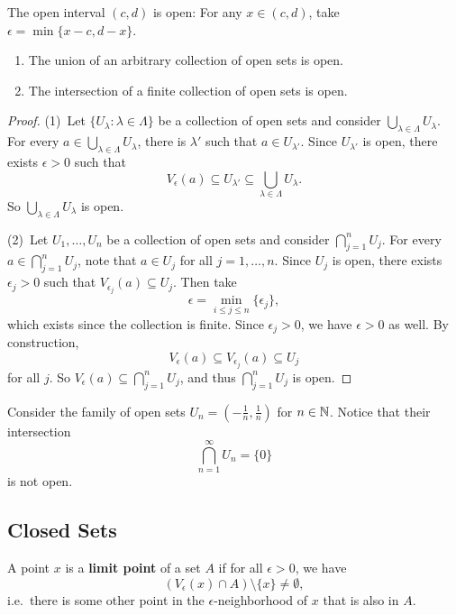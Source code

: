 \begin{example}
  The open interval $(c, d)$ is open: For any
  $x \in (c, d)$, take $\epsilon = \min\{x - c, d - x\}$.
\end{example}

\begin{theorem}\leavevmode
  \begin{enumerate}
    \item The union of an arbitrary collection of open sets
      is open.
    \item The intersection of a finite collection of
      open sets is open.
  \end{enumerate}
\end{theorem}

\begin{proof}
  (1)\, Let $\{U_\lambda : \lambda \in \Lambda\}$ be a
  collection of open sets and consider
  $\bigcup_{\lambda \in \Lambda} U_\lambda$. For
  every $a \in \bigcup_{\lambda \in \Lambda} U_\lambda$,
  there is $\lambda'$ such that $a \in U_{\lambda'}$.
  Since $U_{\lambda'}$ is open, there exists
  $\epsilon > 0$ such that
  \[V_\epsilon(a) \subseteq U_{\lambda'} \subseteq \bigcup_{\lambda \in \Lambda} U_\lambda.\]
  So $\bigcup_{\lambda \in \Lambda} U_\lambda$ is open.

  (2)\, Let $U_1, \ldots, U_n$ be a collection of
  open sets and consider $\bigcap_{j = 1}^n U_j$.
  For every $a \in \bigcap_{j = 1}^n U_j$, note that
  $a \in U_j$ for all $j = 1, \ldots, n$. Since
  $U_j$ is open, there exists $\epsilon_j > 0$ such that
  $V_{\epsilon_j}(a) \subseteq U_j$. Then take
  \[\epsilon = \min_{i \le j \le n}\{\epsilon_j\},\]
  which exists since the collection is finite.
  Since $\epsilon_j > 0$, we have $\epsilon > 0$ as well.
  By construction,
  \[V_\epsilon(a) \subseteq V_{\epsilon_j}(a) \subseteq U_j\]
  for all $j$. So
  $V_\epsilon(a) \subseteq \bigcap_{j = 1}^n U_j$, and
  thus $\bigcap_{j = 1}^n U_j$ is open.
\end{proof}

\begin{example}
  Consider the family of open sets
  $U_n = (-\frac{1}{n}, \frac{1}{n})$ for $n \in \mathbb{N}$. Notice
  that their intersection
  \[\bigcap_{n = 1}^\infty U_n = \{0\}\]
  is not open.
\end{example}

\subsection{Closed Sets}
\begin{definition}
  A point $x$ is a \textbf{limit point} of a set
  $A$ if for all $\epsilon > 0$, 
  we have
  \[(V_\epsilon(x) \cap A) \setminus \{x\} \ne \emptyset,\]
  i.e.~there is some other point in the
  $\epsilon$-neighborhood of $x$ that is also in $A$.
\end{definition}

